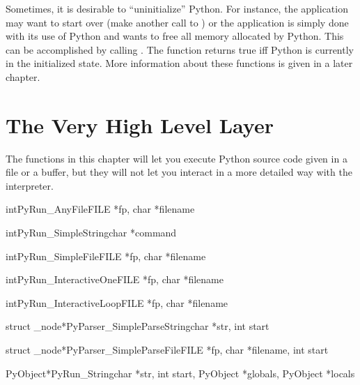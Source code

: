 \documentclass{manual}
\begin{document}
Sometimes, it is desirable to ``uninitialize'' Python.  For instance, 
the application may want to start over (make another call to 
) or the application is simply done with its 
use of Python and wants to free all memory allocated by Python.  This
can be accomplished by calling .  The function
 returns true iff Python is currently in the
initialized state.  More information about these functions is given in
a later chapter.


\chapter{The Very High Level Layer \label{veryhigh}}

The functions in this chapter will let you execute Python source code
given in a file or a buffer, but they will not let you interact in a
more detailed way with the interpreter.

\begin{cfuncdesc}{int}{PyRun_AnyFile}{FILE *fp, char *filename}
\end{cfuncdesc}

\begin{cfuncdesc}{int}{PyRun_SimpleString}{char *command}
\end{cfuncdesc}

\begin{cfuncdesc}{int}{PyRun_SimpleFile}{FILE *fp, char *filename}
\end{cfuncdesc}

\begin{cfuncdesc}{int}{PyRun_InteractiveOne}{FILE *fp, char *filename}
\end{cfuncdesc}

\begin{cfuncdesc}{int}{PyRun_InteractiveLoop}{FILE *fp, char *filename}
\end{cfuncdesc}

\begin{cfuncdesc}{struct _node*}{PyParser_SimpleParseString}{char *str,
                                                             int start}
\end{cfuncdesc}

\begin{cfuncdesc}{struct _node*}{PyParser_SimpleParseFile}{FILE *fp,
                                 char *filename, int start}
\end{cfuncdesc}

\begin{cfuncdesc}{PyObject*}{PyRun_String}{char *str, int start,
                                           PyObject *globals,
                                           PyObject *locals}
\end{cfuncdesc}
\end{document}
